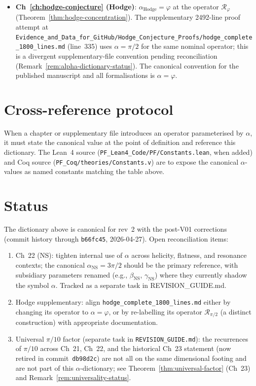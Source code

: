 \begin{itemize}
\item \textbf{Ch~\ref{ch:hodge-conjecture} (Hodge)}: $\alpha_{\mathrm{Hodge}} = \varphi$ at the operator $\mathcal{R}_\varphi$ (Theorem~\ref{thm:hodge-concentration}). The supplementary 2492-line proof attempt at \texttt{Evidence\_and\_Data\_for\_GitHub/Hodge\_Conjecture\_Proofs/hodge\_complete\_1800\_lines.md} (line~335) uses $\alpha = \pi/2$ for the same nominal operator; this is a divergent supplementary-file convention pending reconciliation (Remark~\ref{rem:alpha-dictionary-status}). The canonical convention for the published manuscript and all formalisations is $\alpha = \varphi$.
\end{itemize}

\section*{Cross-reference protocol}

When a chapter or supplementary file introduces an operator parameterised by $\alpha$, it must state the canonical value at the point of definition and reference this dictionary. The Lean~4 source (\texttt{PF\_Lean4\_Code/PF/Constants.lean}, when added) and Coq source (\texttt{PF\_Coq/theories/Constants.v}) are to expose the canonical $\alpha$-values as named constants matching the table above.

\section*{Status}

The dictionary above is canonical for rev~2 with the post-V01 corrections (commit history through \texttt{b66fc45}, 2026-04-27). Open reconciliation items:
\begin{enumerate}
\item Ch~22 (NS): tighten internal use of $\alpha$ across helicity, flatness, and resonance contexts; the canonical $\alpha_{\mathrm{NS}} = 3\pi/2$ should be the primary reference, with subsidiary parameters renamed (e.g., $\beta_{\mathrm{NS}}$, $\gamma_{\mathrm{NS}}$) where they currently shadow the symbol $\alpha$. Tracked as a separate task in REVISION\_GUIDE.md.
\item Hodge supplementary: align \texttt{hodge\_complete\_1800\_lines.md} either by changing its operator to $\alpha = \varphi$, or by re-labelling its operator $\mathcal{R}_{\pi/2}$ (a distinct construction) with appropriate documentation.
\item Universal $\pi/10$ factor (separate task in \texttt{REVISION\_GUIDE.md}): the recurrences of $\pi/10$ across Ch~21, Ch~22, and the historical Ch~23 statement (now retired in commit~\texttt{db98d2c}) are not all on the same dimensional footing and are not part of this $\alpha$-dictionary; see Theorem~\ref{thm:universal-factor} (Ch~23) and Remark~\ref{rem:universality-status}.
\end{enumerate}
